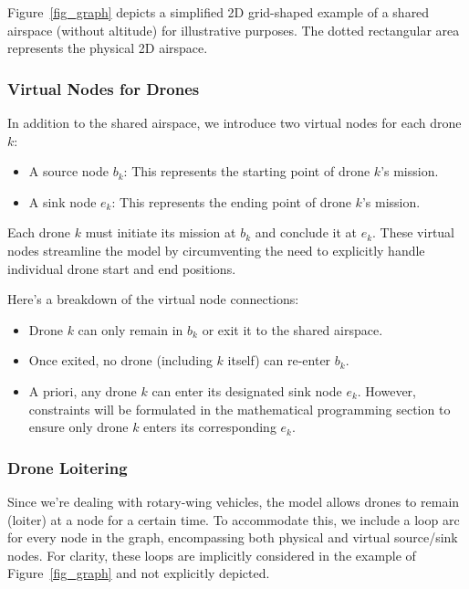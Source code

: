 Figure~\ref{fig_graph} depicts a simplified 2D grid-shaped example of a shared airspace (without altitude) for illustrative purposes. The dotted rectangular area represents the physical 2D airspace.

\subsubsection{Virtual Nodes for Drones}

In addition to the shared airspace, we introduce two virtual nodes for each drone $k$:

\begin{itemize}
  \item A source node $b_k$: This represents the starting point of drone $k$'s mission.
  \item A sink node $e_k$: This represents the ending point of drone $k$'s mission.
\end{itemize}


Each drone $k$ must initiate its mission at $b_k$ and conclude it at $e_k$. These virtual nodes streamline the model by circumventing the need to explicitly handle individual drone start and end positions.

Here's a breakdown of the virtual node connections:

\begin{itemize}
  \item Drone $k$ can only remain in $b_k$ or exit it to the shared airspace.
  \item Once exited, no drone (including $k$ itself) can re-enter $b_k$.
  \item A priori, any drone $k$ can enter its designated sink node $e_k$. However, constraints will be formulated in the mathematical programming section to ensure only drone $k$ enters its corresponding $e_k$.
\end{itemize}

\subsubsection{Drone Loitering}

Since we're dealing with rotary-wing vehicles, the model allows drones to remain (loiter) at a node for a certain time. To accommodate this, we include a loop arc for every node in the graph, encompassing both physical and virtual source/sink nodes. For clarity, these loops are implicitly considered in the example of Figure~\ref{fig_graph} and not explicitly depicted.

